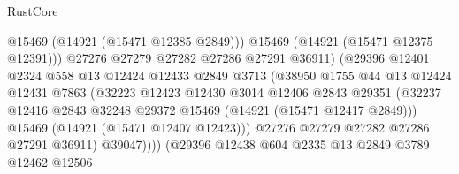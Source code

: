 \begin{lexlean}{RustCore}
\begin{coremodule}
                                        @15469
                                        (@14921 (@15471 @12385 @2849)))
                                      @15469
                                      (@14921 (@15471 @12375 @12391)))
                                    @27276
                                    @27279
                                    @27282
                                    @27286
                                    @27291
                                    @36911)
                                  (@29396
                                    @12401
                                    @2324
                                    @558
                                    @13
                                    @12424
                                    @12433
                                    @2849
                                    @3713
                                    (@38950
                                      @1755
                                      @44
                                      @13
                                      @12424
                                      @12431
                                      @7863
                                      (@32223
                                        @12423
                                        @12430
                                        @3014
                                        @12406
                                        @2843
                                        @29351
                                        (@32237
                                          @12416
                                          @2843
                                          @32248
                                          @29372
                                          @15469
                                          (@14921 (@15471 @12417 @2849)))
                                        @15469
                                        (@14921 (@15471 @12407 @12423)))
                                      @27276
                                      @27279
                                      @27282
                                      @27286
                                      @27291
                                      @36911)
                                    @39047))))
                            (@29396
                              @12438
                              @604
                              @2335
                              @13
                              @2849
                              @3789
                              @12462
                              @12506

\end{coremodule}
\end{lexlean}
